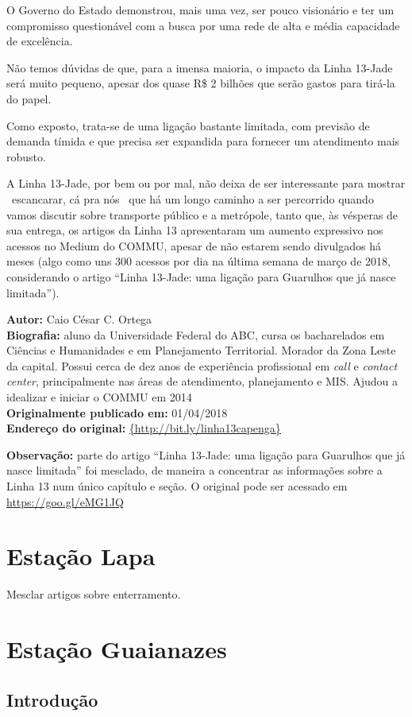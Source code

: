 \documentclass[11pt,fleqn]{book} %
\newcommand{\infocaio}[2]{\textbf{Autor:} Caio C\'{e}sar C. Ortega \\ \textbf{Biografia:} aluno da Universidade Federal do ABC, cursa os bacharelados em Ci\^{e}ncias e Humanidades e em Planejamento Territorial. Morador da Zona Leste da capital. Possui cerca de dez anos de experi\^{e}ncia profissional em \textit{call} e \textit{contact center}, principalmente nas \'{a}reas de atendimento, planejamento e MIS. Ajudou a idealizar e iniciar o COMMU em 2014 \\ \textbf{Originalmente publicado em:} {#1} \\ \textbf{Endere\c{c}o do original:} \url{{#2}}}
\begin{document}
O Governo do Estado demonstrou, mais uma vez, ser pouco visionário e ter um compromisso questionável com a busca por uma rede de alta e média capacidade de excelência.

Não temos dúvidas de que, para a imensa maioria, o impacto da Linha 13-Jade será muito pequeno, apesar dos quase R\$ 2 bilhões que serão gastos para tirá-la do papel.

Como exposto, trata-se de uma ligação bastante limitada, com previsão de demanda tímida e que precisa ser expandida para fornecer um atendimento mais robusto.

A Linha 13-Jade, por bem ou por mal, não deixa de ser interessante para mostrar \textemdash\ escancarar, cá pra nós \textemdash\ que há um longo caminho a ser percorrido quando vamos discutir sobre transporte público e a metrópole, tanto que, às vésperas de sua entrega, os artigos da Linha 13 apresentaram um aumento expressivo nos acessos no Medium do COMMU, apesar de não estarem sendo divulgados há meses (algo como uns 300 acessos por dia na última semana de março de 2018, considerando o artigo ``Linha 13-Jade: uma ligação para Guarulhos que já nasce limitada'').

\begin{info}
	\infocaio{01/04/2018}{http://bit.ly/linha13capenga}
\end{info}

\begin{obs}
	\textbf{Observação:} parte do artigo ``Linha 13-Jade: uma ligação para Guarulhos que já nasce limitada'' foi mesclado, de maneira a concentrar as informações sobre a Linha 13 num único capítulo e seção. O original pode ser acessado em \url{https://goo.gl/eMG1JQ}
\end{obs}

\section{Estação Lapa}

Mesclar artigos sobre enterramento.

\section{Estação Guaianazes}

\subsection{Introdução}
\end{document}
